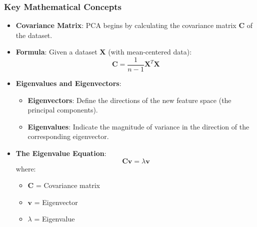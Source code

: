 \documentclass[aspectratio=169]{beamer}
\begin{document}
\begin{frame}[fragile]
    \frametitle{Key Mathematical Concepts}
    \begin{itemize}
        \item \textbf{Covariance Matrix}: PCA begins by calculating the covariance matrix \( \mathbf{C} \) of the dataset.
        \item \textbf{Formula}: Given a dataset \( \mathbf{X} \) (with mean-centered data):
        \begin{equation}
            \mathbf{C} = \frac{1}{n-1} \mathbf{X}^T \mathbf{X}
        \end{equation}
        \item \textbf{Eigenvalues and Eigenvectors}:
        \begin{itemize}
            \item \textbf{Eigenvectors}: Define the directions of the new feature space (the principal components).
            \item \textbf{Eigenvalues}: Indicate the magnitude of variance in the direction of the corresponding eigenvector.
        \end{itemize}
        
        \item \textbf{The Eigenvalue Equation}:
        \begin{equation}
            \mathbf{C} \mathbf{v} = \lambda \mathbf{v}
        \end{equation}
        where:
        \begin{itemize}
            \item \( \mathbf{C} \) = Covariance matrix
            \item \( \mathbf{v} \) = Eigenvector
            \item \( \lambda \) = Eigenvalue
        \end{itemize}
    \end{itemize}
\end{frame}
\end{document}
